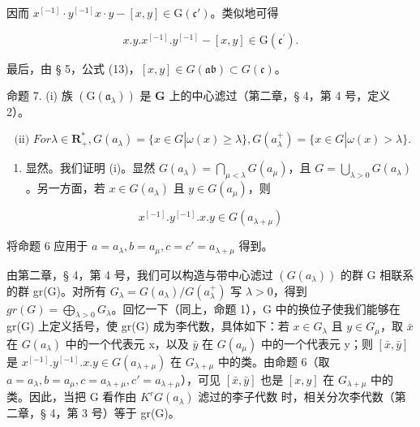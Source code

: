 因而 \(x^{[-1]} \cdot y^{[-1]}x \cdot y - [x, y] \in \mathrm{G}(\mathfrak{c}')\)。类似地可得

\[
x. y. x ^ {[ - 1 ]}. y ^ {[ - 1 ]} - [ x, y ] \in \mathrm{G} (\mathfrak {c} ^ {\prime}).
\]

最后，由 § 5，公式 (13)，\([x,y] \in G(\mathfrak{ab}) \subset G(\mathfrak{c})\)。

命题 7. (i) 族 \((\mathrm{G}(\mathfrak{a}_{\lambda}))\) 是 \(\mathbf{G}\) 上的中心滤过（第二章，§ 4，第 4 号，定义 2）。

\[
\text { (ii) } For \lambda \in \mathbf {R} _ {+} ^ {*}, G (a _ {\lambda}) = \{x \in G | \omega (x) \geqslant \lambda \}, G (a _ {\lambda} ^ {+}) = \{x \in G | \omega (x) > \lambda \}.
\]

\begin{enumerate}
\def\labelenumi{(\roman{enumi})}
\setcounter{enumi}{1}
\tightlist
\item
  显然。我们证明 (i)。显然 \(G(a_{\lambda}) = \bigcap_{\mu < \lambda} G(a_{\mu})\)，且 \(G = \bigcup_{\lambda > 0} G(a_{\lambda})\)。另一方面，若 \(x \in G(a_{\lambda})\) 且 \(y \in G(a_{\mu})\)，则
\end{enumerate}

\[
x ^ {[ - 1 ]}. y ^ {[ - 1 ]}. x. y \in G (a _ {\lambda + \mu})
\]

将命题 6 应用于 \(a = a_{\lambda}, b = a_{\mu}, c = c' = a_{\lambda + \mu}\) 得到。

由第二章，§ 4，第 4 号，我们可以构造与带中心滤过 \((G(a_\lambda))\) 的群 G 相联系的群 gr(G)。对所有 \(G_\lambda = G(a_\lambda)/G(a_\lambda^+)\) 写 \(\lambda > 0\)，得到 \(gr(G) = \bigoplus_{\lambda>0} G_\lambda\)。回忆一下（同上，命题 1），G 中的换位子使我们能够在 gr(G) 上定义括号，使 gr(G) 成为李代数，具体如下：若 \(x \in G_\lambda\) 且 \(y \in G_\mu\)，取 \(\bar{x}\) 在 \(G(a_\lambda)\) 中的一个代表元 x，以及 \(\bar{y}\) 在 \(G(a_\mu)\) 中的一个代表元 y；则 \([\bar{x},\bar{y}]\) 是 \(x^{[-1]}.y^{[-1]}.x.y \in G(a_{\lambda+\mu})\) 在 \(G_{\lambda+\mu}\) 中的类。由命题 6（取 \(a = a_\lambda, b = a_\mu, c = a_{\lambda+\mu}, c' = a_{\lambda+\mu}\)），可见 \([\bar{x},\bar{y}]\) 也是 \([x,y]\) 在 \(G_{\lambda+\mu}\) 中的类。因此，当把 G 看作由 \(K^r\)\(G(a_\lambda)\) 滤过的李子代数  时，相关分次李代数（第二章，§ 4，第 3 号）等于 gr(G)。

